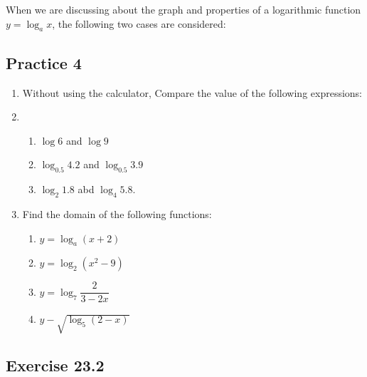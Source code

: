\documentclass[12pt]{report}
\begin{document}
When we are discussing about the graph and properties of a logarithmic function
$y = \log_a x$, the following two cases are considered: \newpage

\subsection*{Practice 4}

\setlength{\columnseprule}{1pt}
\setlength{\columnsep}{24pt}

\begin{multicols}{2}
  \begin{enumerate}
    \item Without using the calculator, Compare the value of the following expressions:
    \item \begin{enumerate}
            \item $\log 6$ and $\log 9$
            \item $\log_{0.5} 4.2$ and $\log_{0.5} 3.9$
            \item $\log_2 1.8$ abd $\log_4 5.8$.
          \end{enumerate}
    \item Find the domain of the following functions:
          \begin{enumerate}
            \item $y = \log_a(x+2)$
            \item $y = \log_2(x^2 - 9)$
            \item $y = \log_7\dfrac{2}{3-2x}$
            \item $y - \sqrt{\log_5(2-x)}$
          \end{enumerate}
  \end{enumerate}
\end{multicols}

\subsection*{Exercise 23.2}

\setlength{\columnseprule}{1pt}
\setlength{\columnsep}{24pt}
\end{document}
